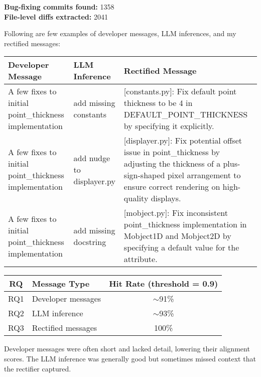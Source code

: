 \documentclass[10pt,a4paper]{report}
\begin{document}
\textbf{Bug-fixing commits found:} 1358\\
\textbf{File-level diffs extracted:} 2041

Following are few examples of developer messages, LLM inferences, and my rectified messages:

\begin{tabular}{|p{4cm}|p{4cm}|p{7cm}|}
\hline
\textbf{Developer Message} & \textbf{LLM Inference} & \textbf{Rectified Message} \\
\hline
A few fixes to initial point\_thickness implementation & add missing constants & [constants.py]: Fix default point thickness to be 4 in DEFAULT\_POINT\_THICKNESS by specifying it explicitly. \\
\hline
A few fixes to initial point\_thickness implementation & add nudge to displayer.py & [displayer.py]: Fix potential offset issue in point\_thickness by adjusting the thickness of a plus-sign-shaped pixel arrangement to ensure correct rendering on high-quality displays. \\
\hline
A few fixes to initial point\_thickness implementation & add missing docstring & [mobject.py]: Fix inconsistent point\_thickness implementation in Mobject1D and Mobject2D by specifying a default value for the attribute. \\
\hline
\end{tabular}

\vspace{1em}

\begin{tabular}{|c|l|c|}
\hline
\textbf{RQ}  & \textbf{Message Type}    & \textbf{Hit Rate (threshold = 0.9)} \\
\hline
RQ1 & Developer messages  & $\sim$91\% \\
RQ2 & LLM inference       & $\sim$93\% \\
RQ3 & Rectified messages  & 100\% \\
\hline
\end{tabular}

Developer messages were often short and lacked detail, lowering their alignment scores. The LLM inference was generally good but sometimes missed context that the rectifier captured.
\end{document}
